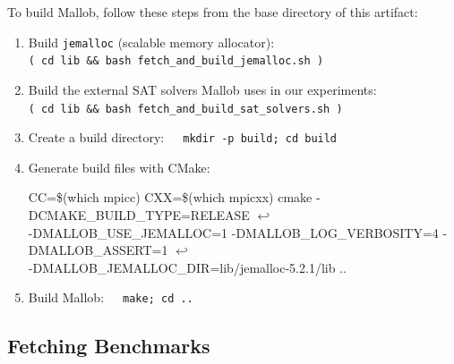\documentclass[runningheads]{article}
\newcommand{\CR}{{\tiny$\hookleftarrow$}}
\numberwithin{dummy}{subsection}
\begin{document}
To build Mallob, follow these steps from the base directory of this artifact:
\begin{enumerate}
 \item Build \texttt{jemalloc} (scalable memory allocator):\\
 \texttt{( cd lib \&\& bash fetch\_and\_build\_jemalloc.sh )}
 \item Build the external SAT solvers Mallob uses in our experiments:\\
 \texttt{( cd lib \&\& bash fetch\_and\_build\_sat\_solvers.sh )}
 \item Create a build directory:\ \ \ \texttt{mkdir -p build; cd build}
 \item Generate build files with CMake:
 \begin{ttfenv}
 CC=\$(which mpicc) CXX=\$(which mpicxx) cmake -DCMAKE\_BUILD\_TYPE=RELEASE \CR\\
 -DMALLOB\_USE\_JEMALLOC=1 -DMALLOB\_LOG\_VERBOSITY=4 -DMALLOB\_ASSERT=1 \CR\\
 -DMALLOB\_JEMALLOC\_DIR=lib/jemalloc-5.2.1/lib ..
 \end{ttfenv}
 \item Build Mallob:\ \ \ \texttt{make; cd ..}
\end{enumerate}

\subsection{Fetching Benchmarks}
\end{document}
